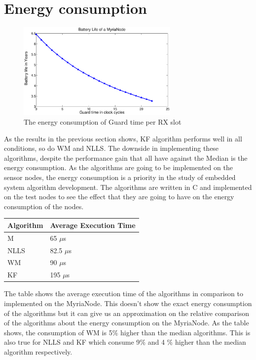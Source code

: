 \documentclass[a4paper,10pt]{report}
\begin{document}
\section{\textbf{Energy consumption}}
\begin{figure}
\centering
\includegraphics[width=0.7\textwidth]{guardsave}
\caption{The energy consumption of Guard time per RX slot}
\label{guardsave}
\end{figure}
As the results in the previous section shows, KF algorithm performs well in all conditions, so do WM and NLLS. The downside in
implementing these algorithms, despite the performance gain that all have against the Median is the energy consumption. As the algorithms are going to be implemented on the sensor nodes, the energy consumption is a priority in the study of embedded system algorithm development. The algorithms are written in C and implemented on the test nodes to see the effect that they are going to have on the energy consumption of the nodes.
\begin{center}
    \begin{tabular}{ |p{2cm} | p{4.75cm} |}
    \hline
    Algorithm & Average Execution Time \\ \hline
    M &  65 $\mu$s \\ \hline
    NLLS & 82.5 $\mu$s \\ \hline
    WM &   90 $\mu$s \\ \hline
    KF &  195 $\mu$s  \\ \hline
    \end{tabular}
\label{tab}
\end{center}
The table shows the average execution time of the algorithms in comparison to implemented on the MyriaNode. This doesn't show the
exact energy consumption of the algorithms but it can give us an approximation on the relative comparison of the algorithms about the energy consumption on the MyriaNode. As the table shows, the consumption of WM is 5$\%$ higher than the median algorithms. This
is also true for NLLS and KF which consume 9$\%$ and 4 $\%$ higher than the median algorithm respectively. 
\end{document}
